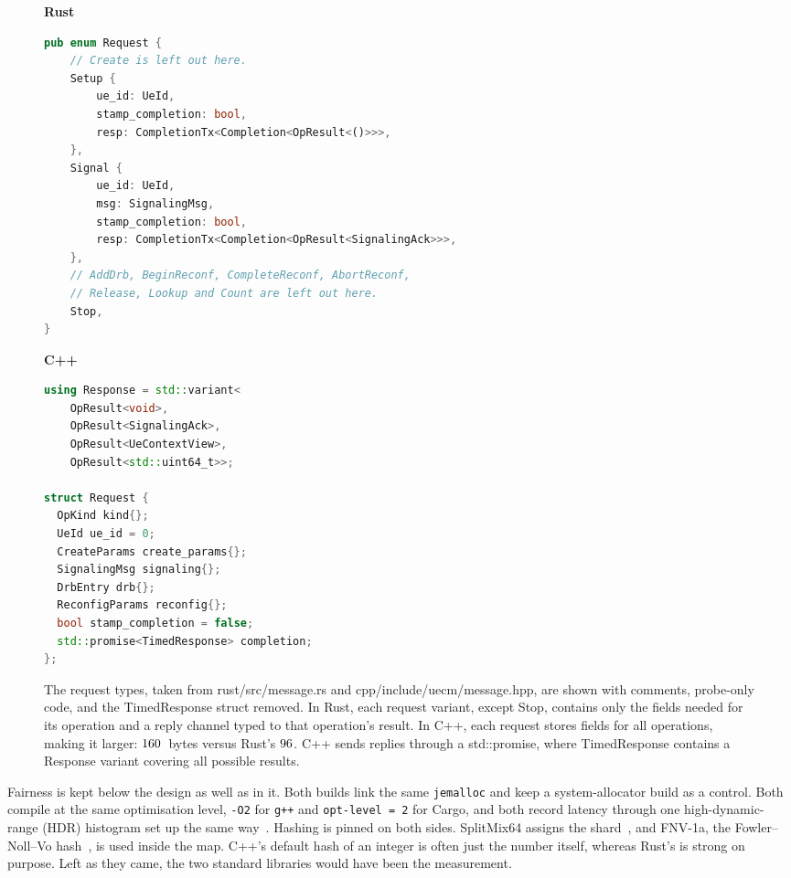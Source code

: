 \documentclass[english,oneside,a4paper,censored,csm,software-track-2020]{HYthesisML}
\begin{document}
\enlargethispage{-\baselineskip}
\begin{figure}[!t]
\centering
\begingroup
\lstset{basicstyle=\ttfamily\tiny,aboveskip=1pt,belowskip=1pt}
\begin{minipage}[t]{0.595\linewidth}
{\footnotesize\textbf{Rust}}
\begin{lstlisting}[language=Rust]
pub enum Request {
    // Create is left out here.
    Setup {
        ue_id: UeId,
        stamp_completion: bool,
        resp: CompletionTx<Completion<OpResult<()>>>,
    },
    Signal {
        ue_id: UeId,
        msg: SignalingMsg,
        stamp_completion: bool,
        resp: CompletionTx<Completion<OpResult<SignalingAck>>>,
    },
    // AddDrb, BeginReconf, CompleteReconf, AbortReconf,
    // Release, Lookup and Count are left out here.
    Stop,
}
\end{lstlisting}
\end{minipage}\hfill
\begin{minipage}[t]{0.39\linewidth}
{\footnotesize\textbf{C++}}
\begin{lstlisting}[language=C++]
using Response = std::variant<
    OpResult<void>,
    OpResult<SignalingAck>,
    OpResult<UeContextView>,
    OpResult<std::uint64_t>>;

struct Request {
  OpKind kind{};
  UeId ue_id = 0;
  CreateParams create_params{};
  SignalingMsg signaling{};
  DrbEntry drb{};
  ReconfigParams reconfig{};
  bool stamp_completion = false;
  std::promise<TimedResponse> completion;
};
\end{lstlisting}
\end{minipage}
\caption[The request type in each language]{The request types, taken from rust/src/message.rs 
and cpp/include/uecm/message.hpp, are shown with comments, probe-only code, and the TimedResponse 
struct removed. In Rust, each request variant, except Stop, contains only the fields needed for 
its operation and a reply channel typed to that operation’s result. In C++, each request stores 
fields for all operations, making it larger: $160$~bytes versus Rust's $96$. 
C++ sends replies through a std::promise, where TimedResponse contains a Response variant covering 
all possible results.\label{fig:request}}
\endgroup
\end{figure}

Fairness is kept below the design as well as in it. Both builds link the same
\texttt{jemalloc} and keep a system-allocator build as a control. Both compile
at the same optimisation level, \texttt{-O2} for \texttt{g++} and
\texttt{opt-level = 2} for Cargo, and both record latency through one
high-dynamic-range (HDR) histogram set up the same way~\cite{tene_hdrhistogram}.
Hashing is pinned on both sides. SplitMix64 assigns the
shard~\cite{steele2014splitmix}, and FNV-1a, the Fowler--Noll--Vo
hash~\cite{rfc9923}, is used inside the map. C++'s default hash of an integer is
often just the number itself, whereas Rust's is strong on purpose. Left as they
came, the two standard libraries would have been the measurement.
\end{document}
